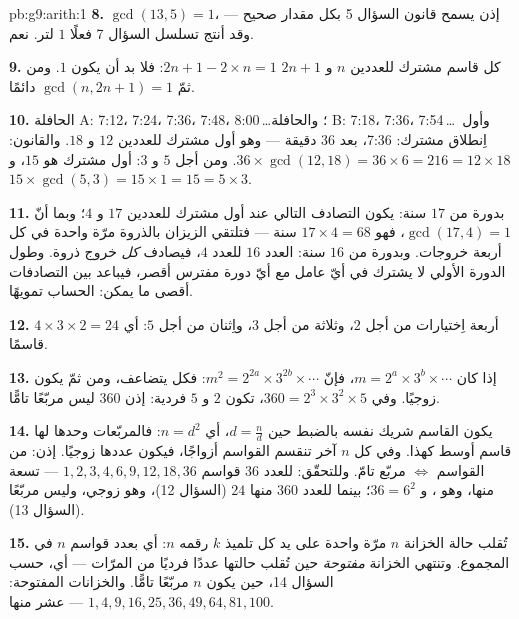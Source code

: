 \begin{solution}{pb:g9:arith:1}
\textbf{8.} $\gcd(13, 5) = 1$، إذن يسمح قانون السؤال 5 بكل مقدار
صحيح --- وقد أنتج تسلسل السؤال 7 فعلًا $1$ لتر. نعم.

\textbf{9.} كل قاسم مشترك للعددين $n$ و $2n + 1$ 
$2n + 1 - 2 \times n = 1$: فلا بد أن يكون $1$. ومن ثمّ
$\gcd(n, 2n+1) = 1$ دائمًا.

\textbf{10.} الحافلة A: 7:12، 7:24، 7:36، 7:48، 8:00\,\dots؛
والحافلة B: 7:18، 7:36، 7:54\,\dots\ وأول اِنطلاق مشترك: 7:36،
بعد $36$ دقيقة --- وهو أول  مشترك للعددين $12$ و $18$.
والقانون: $36 \times \gcd(12, 18) = 36 \times 6 = 216 = 12 \times
18$. ومن أجل $5$ و $3$: أول  مشترك هو $15$، و
$15 \times \gcd(5,3) = 15 \times 1 = 15 = 5 \times 3$.

\textbf{11.} بدورة من $17$ سنة: يكون التصادف التالي عند أول
 مشترك للعددين $17$ و $4$؛ وبما أنّ $\gcd(17, 4) = 1$، فهو
$17 \times 4 = 68$ سنة --- فتلتقي الزيزان بالذروة مرّة واحدة في
كل أربعة خروجات. وبدورة من $16$ سنة: العدد $16$  للعدد
$4$، فيصادف \emph{كل} خروج ذروة. وطول الدورة الأولي لا يشترك في
أيّ عامل مع أيّ دورة مفترس أقصر، فيباعد بين التصادفات أقصى ما
يمكن: الحساب تمويهًا.

\textbf{12.} أربعة اِختيارات  من أجل $2$، وثلاثة من أجل
$3$، واِثنان من أجل $5$: أي $4 \times 3 \times 2 = 24$ قاسمًا.

\textbf{13.} إذا كان $m = 2^{a} \times 3^{b} \times \cdots$، فإنّ
$m^2 = 2^{2a} \times 3^{2b} \times \cdots$: فكل  يتضاعف،
ومن ثمّ يكون زوجيًا. وفي $360 = 2^3 \times 3^2 \times 5$، تكون
 $2$ و $5$ فردية: إذن $360$ ليس مربّعًا تامًّا.

\textbf{14.} يكون القاسم شريك نفسه بالضبط حين $d = \frac nd$، أي
$n = d^2$: فالمربّعات وحدها لها قاسم أوسط كهذا. وفي كل $n$ آخر
تنقسم القواسم أزواجًا، فيكون عددها زوجيًا. إذن:  من القواسم $\Leftrightarrow$ مربّع تامّ. وللتحقّق: للعدد
$36$ قواسم $1, 2, 3, 4, 6, 9, 12, 18, 36$ --- تسعة منها، وهو
، و $36 = 6^2$؛ بينما للعدد $360$ منها $24$ (السؤال
12)، وهو زوجي، وليس مربّعًا (السؤال 13).

\textbf{15.} تُقلب حالة الخزانة $n$ مرّة واحدة على يد كل تلميذ
$k$  رقمه $n$: أي بعدد قواسم $n$ في المجموع. وتنتهي
الخزانة \emph{مفتوحة} حين تُقلب حالتها عددًا فرديًا من المرّات
--- أي، حسب السؤال 14، حين يكون $n$ مربّعًا تامًّا. والخزانات
المفتوحة: $1, 4, 9, 16, 25, 36, 49, 64, 81, 100$ --- عشر منها.
\end{solution}
